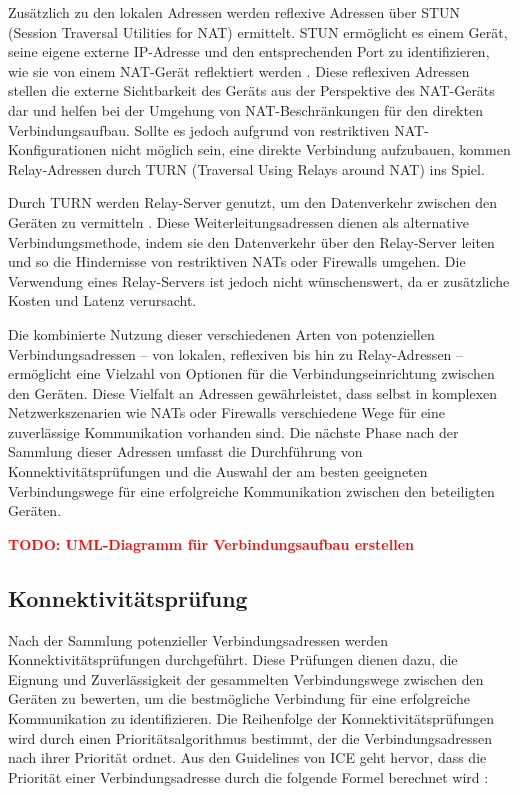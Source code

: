 Zusätzlich zu den lokalen Adressen werden reflexive Adressen über STUN (Session Traversal Utilities for NAT) ermittelt. STUN ermöglicht es einem Gerät, seine eigene externe IP-Adresse und den entsprechenden Port zu identifizieren, wie sie von einem NAT-Gerät reflektiert werden \parencite[S. 4]{rfc8489_STUN}. Diese reflexiven Adressen stellen die externe Sichtbarkeit des Geräts aus der Perspektive des NAT-Geräts dar und helfen bei der Umgehung von NAT-Beschränkungen für den direkten Verbindungsaufbau. Sollte es jedoch aufgrund von restriktiven NAT-Konfigurationen nicht möglich sein, eine direkte Verbindung aufzubauen, kommen Relay-Adressen durch TURN (Traversal Using Relays around NAT) ins Spiel.

Durch TURN werden Relay-Server genutzt, um den Datenverkehr zwischen den Geräten zu vermitteln \parencite[S. 10 f.]{rfc8656_TURN}. Diese Weiterleitungsadressen dienen als alternative Verbindungsmethode, indem sie den Datenverkehr über den Relay-Server leiten und so die Hindernisse von restriktiven NATs oder Firewalls umgehen. Die Verwendung eines Relay-Servers ist jedoch nicht wünschenswert, da er zusätzliche Kosten und Latenz verursacht.

Die kombinierte Nutzung dieser verschiedenen Arten von potenziellen Verbindungsadressen – von lokalen, reflexiven bis hin zu Relay-Adressen – ermöglicht eine Vielzahl von Optionen für die Verbindungseinrichtung zwischen den Geräten. Diese Vielfalt an Adressen gewährleistet, dass selbst in komplexen Netzwerkszenarien wie NATs oder Firewalls verschiedene Wege für eine zuverlässige Kommunikation vorhanden sind. 
Die nächste Phase nach der Sammlung dieser Adressen umfasst die Durchführung von Konnektivitätsprüfungen und die Auswahl der am besten geeigneten Verbindungswege für eine erfolgreiche Kommunikation zwischen den beteiligten Geräten.


\textbf{\textcolor{red}{TODO: UML-Diagramm für Verbindungsaufbau erstellen}}


\subsection{Konnektivitätsprüfung}

Nach der Sammlung potenzieller Verbindungsadressen werden Konnektivitätsprüfungen durchgeführt. Diese Prüfungen dienen dazu, die Eignung und Zuverlässigkeit der gesammelten Verbindungswege zwischen den Geräten zu bewerten, um die bestmögliche Verbindung für eine erfolgreiche Kommunikation zu identifizieren. Die Reihenfolge der Konnektivitätsprüfungen wird durch einen Prioritätsalgorithmus bestimmt, der die Verbindungsadressen nach ihrer Priorität ordnet. Aus den Guidelines von ICE geht hervor, dass die Priorität einer Verbindungsadresse durch die folgende Formel berechnet wird \parencite[S. 22]{rfc8445_ICE}:

